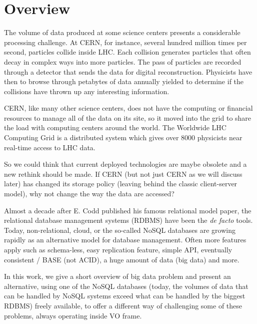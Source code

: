 \chapter{Overview}


The volume of data produced at some science centers presents a considerable processing challenge. At CERN, for instance, several hundred million times per second, particles collide inside LHC. Each collision generates particles that often decay in complex ways into more particles. The pass of particles are recorded through a detector that sends the data for digital reconstruction. Physicists have then to browse through petabytes of data annually yielded to determine if the collisions have thrown up any interesting information.

CERN, like many other science centers, does not have the computing or financial resources to manage all of the data on its site, so it moved into the grid to share the load with computing centers around the world. The Worldwide LHC Computing Grid is a distributed system which gives over 8000 physicists near real-time access to LHC data.

So we could think that current deployed technologies are maybe obsolete and a new rethink should be made. If CERN (but not just CERN as we will discuss later) has changed its storage policy (leaving behind the classic client-server model), why not change the way the data are accessed? 

Almost a decade after E. Codd published his famous relational model paper, the relational database management systems (RDBMS) have been the \textit{de facto} tools. Today, non-relational, cloud, or the so-called NoSQL databases are growing rapidly as an alternative model for database management. Often more features apply such as schema-less, easy replication feature, simple API, eventually consistent / BASE (not ACID), a huge amount of data (big data) and more. 

In this work, we give a short overview of big data problem and present an alternative, using one of the NoSQL databases (today, the volumes of data that can be handled by NoSQL systems exceed what can be handled by the biggest RDBMS) freely available, to offer a different way of challenging some of these problems, always operating inside VO frame.